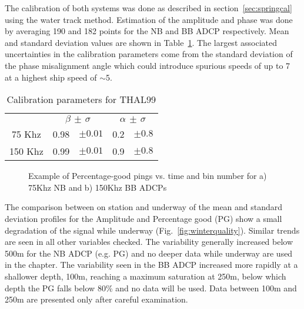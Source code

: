 The calibration of both systems was done as described in
section~\ref{sec:springcal} using the water track method.
Estimation of the amplitude and phase was done by averaging 190
and 182 points for the NB and BB ADCP respectively. Mean and
standard deviation values are shown in Table~\ref{tb:wintercal}.
The largest associated uncertainties in the calibration parameters
come from the standard deviation of the phase misalignment angle
which could introduce spurious speeds of up to 7\velc\, at a
highest ship speed of $\sim$5\vel.

\begin{table}[th]
  \centering
\begin{tabular}{cllll}
\hline \hline & \multicolumn{2}{c}{$\beta \, \pm \, \sigma$} &
\multicolumn{2}{c}{$\alpha \, \pm \, \sigma$} \\ \cline{1-5}
75 Khz & 0.98 & $\pm 0.01$ & 0.2 & $\pm 0.8 $\\
150 Khz & 0.99 & $\pm 0.01$ & 0.9 & $\pm 0.8 $\\
\hline \hline
\end{tabular}
  \caption{Calibration parameters for THAL99}\label{tb:wintercal}
\end{table}
\begin{figure}
\hspace*{2.8cm}
\hspace*{2.8cm}
\caption{Example of Percentage-good pings vs. time and bin number
for a) 75Khz NB and b) 150Khz BB ADCPs  } \label{fig:winterpgood}
\end{figure}

The comparison between on station and underway of the mean and
standard deviation profiles for the Amplitude and Percentage good
(PG) show a small degradation of the signal while underway
(Fig.~\ref{fig:winterquality}). Similar trends are seen in all
other variables checked. The variability generally increased below
500m for the NB ADCP (e.g. PG) and no deeper data while underway
are used in the chapter. The variability seen in the BB ADCP
increased more rapidly at a shallower depth, 100m, reaching a
maximum saturation at 250m, below which depth the PG falls below
80\% and no data will be used. Data between 100m and 250m are
presented only after careful examination.

